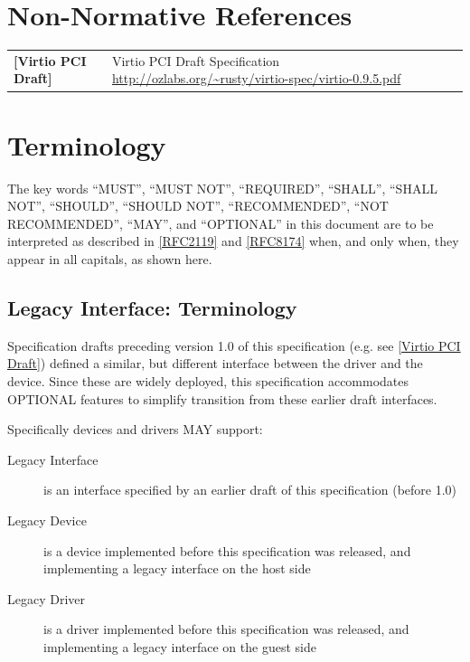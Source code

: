 \section{Non-Normative References}

\begin{longtable}{l p{5in}}
	\label{intro:Virtio PCI Draft}\textbf{[Virtio PCI Draft]} &
	Virtio PCI Draft Specification
	\newline\url{http://ozlabs.org/~rusty/virtio-spec/virtio-0.9.5.pdf}\\
\end{longtable}

\section{Terminology}\label{Terminology}

The key words ``MUST'', ``MUST NOT'', ``REQUIRED'', ``SHALL'', ``SHALL NOT'',
``SHOULD'', ``SHOULD NOT'', ``RECOMMENDED'', ``NOT RECOMMENDED'', ``MAY'', and
``OPTIONAL'' in this document are to be interpreted as described in
\hyperref[intro:rfc2119]{[RFC2119]} and \hyperref[intro:rfc8174]{[RFC8174]} when,
and only when, they appear in all capitals, as shown here.
\subsection{Legacy Interface: Terminology}\label{intro:Legacy
Interface: Terminology}

Specification drafts preceding version 1.0 of this specification
(e.g. see \hyperref[intro:Virtio PCI Draft]{[Virtio PCI Draft]})
defined a similar, but different
interface between the driver and the device.
Since these are widely deployed, this specification
accommodates OPTIONAL features to simplify transition
from these earlier draft interfaces.

Specifically devices and drivers MAY support:
\begin{description}
\item[Legacy Interface]
        is an interface specified by an earlier draft of this specification
        (before 1.0)
\item[Legacy Device]
        is a device implemented before this specification was released,
        and implementing a legacy interface on the host side
\item[Legacy Driver]
        is a driver implemented before this specification was released,
        and implementing a legacy interface on the guest side
\end{description}

